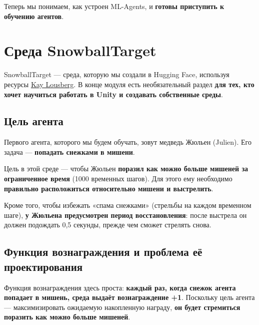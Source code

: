 \documentclass[11pt,a4paper]{article}
\begin{document}
Теперь мы понимаем, как устроен ML-Agents, и \textbf{готовы приступить к обучению агентов}.

\section{Среда SnowballTarget}\label{the-snowballtarget-environment}


SnowballTarget --- среда, которую мы создали в Hugging Face, используя ресурсы \href{https://kaylousberg.com/}{Kay Lousberg}. В конце модуля есть необязательный раздел \textbf{для тех, кто хочет научиться работать в Unity и создавать собственные среды}.

\subsection{Цель агента}\label{the-agents-goal}

Первого агента, которого мы будем обучать, зовут медведь Жюльен (Julien). Его задача --- \textbf{попадать снежками в мишени}.

Цель в этой среде --- чтобы Жюльен \textbf{поразил как можно больше мишеней за ограниченное время} (1000 временных шагов). Для этого ему необходимо \textbf{правильно расположиться относительно мишени и выстрелить}.

Кроме того, чтобы избежать «спама снежками» (стрельбы на каждом временном шаге), \textbf{у Жюльена предусмотрен период восстановления}: после выстрела он должен подождать 0,5 секунды, прежде чем сможет стрелять снова.


\subsection{Функция вознаграждения и проблема её проектирования}\label{the-reward-function-and-the-reward-engineering-problem}

Функция вознаграждения здесь проста: \textbf{каждый раз, когда снежок агента попадает в мишень, среда выдаёт вознаграждение +1}. Поскольку цель агента --- максимизировать ожидаемую накопленную награду, \textbf{он будет стремиться поразить как можно больше мишеней}.
\end{document}
